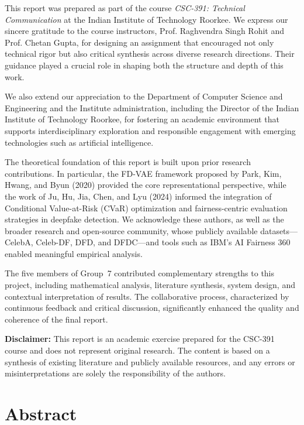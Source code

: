 \documentclass[a4paper,12pt,twoside]{report}
\begin{document}
This report was prepared as part of the course \textit{CSC-391: Technical Communication} at the Indian Institute of Technology Roorkee. We express our sincere gratitude to the course instructors, Prof. Raghvendra Singh Rohit and Prof. Chetan Gupta, for designing an assignment that encouraged not only technical rigor but also critical synthesis across diverse research directions. Their guidance played a crucial role in shaping both the structure and depth of this work.

We also extend our appreciation to the Department of Computer Science and Engineering and the Institute administration, including the Director of the Indian Institute of Technology Roorkee, for fostering an academic environment that supports interdisciplinary exploration and responsible engagement with emerging technologies such as artificial intelligence.

The theoretical foundation of this report is built upon prior research contributions. In particular, the FD-VAE framework proposed by Park, Kim, Hwang, and Byun (2020) provided the core representational perspective, while the work of Ju, Hu, Jia, Chen, and Lyu (2024) informed the integration of Conditional Value-at-Risk (CVaR) optimization and fairness-centric evaluation strategies in deepfake detection. We acknowledge these authors, as well as the broader research and open-source community, whose publicly available datasets—CelebA, Celeb-DF, DFD, and DFDC—and tools such as IBM’s AI Fairness 360 enabled meaningful empirical analysis.

The five members of Group~7 contributed complementary strengths to this project, including mathematical analysis, literature synthesis, system design, and contextual interpretation of results. The collaborative process, characterized by continuous feedback and critical discussion, significantly enhanced the quality and coherence of the final report.

\bigskip

\noindent\textbf{Disclaimer:} This report is an academic exercise prepared for the CSC-391 course and does not represent original research. The content is based on a synthesis of existing literature and publicly available resources, and any errors or misinterpretations are solely the responsibility of the authors.
\cleardoublepage
\chapter*{Abstract}
\label{ch:abstract}
\end{document}
